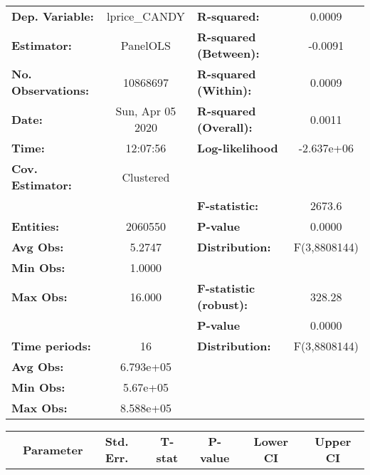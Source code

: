 \documentclass{report}
\begin{document}
\begin{center}
\begin{tabular}{lclc}
\toprule
\textbf{Dep. Variable:}    &   lprice\_CANDY    & \textbf{  R-squared:         }   &      0.0009      \\
\textbf{Estimator:}        &      PanelOLS      & \textbf{  R-squared (Between):}  &     -0.0091      \\
\textbf{No. Observations:} &      10868697      & \textbf{  R-squared (Within):}   &      0.0009      \\
\textbf{Date:}             &  Sun, Apr 05 2020  & \textbf{  R-squared (Overall):}  &      0.0011      \\
\textbf{Time:}             &      12:07:56      & \textbf{  Log-likelihood     }   &    -2.637e+06    \\
\textbf{Cov. Estimator:}   &     Clustered      & \textbf{                     }   &                  \\
\textbf{}                  &                    & \textbf{  F-statistic:       }   &      2673.6      \\
\textbf{Entities:}         &      2060550       & \textbf{  P-value            }   &      0.0000      \\
\textbf{Avg Obs:}          &       5.2747       & \textbf{  Distribution:      }   &   F(3,8808144)   \\
\textbf{Min Obs:}          &       1.0000       & \textbf{                     }   &                  \\
\textbf{Max Obs:}          &       16.000       & \textbf{  F-statistic (robust):} &      328.28      \\
\textbf{}                  &                    & \textbf{  P-value            }   &      0.0000      \\
\textbf{Time periods:}     &         16         & \textbf{  Distribution:      }   &   F(3,8808144)   \\
\textbf{Avg Obs:}          &     6.793e+05      & \textbf{                     }   &                  \\
\textbf{Min Obs:}          &      5.67e+05      & \textbf{                     }   &                  \\
\textbf{Max Obs:}          &     8.588e+05      & \textbf{                     }   &                  \\
\bottomrule
\end{tabular}
\begin{tabular}{lcccccc}
                           & \textbf{Parameter} & \textbf{Std. Err.} & \textbf{T-stat} & \textbf{P-value} & \textbf{Lower CI} & \textbf{Upper CI}  \\

\end{tabular}
\end{center}
\end{document}

